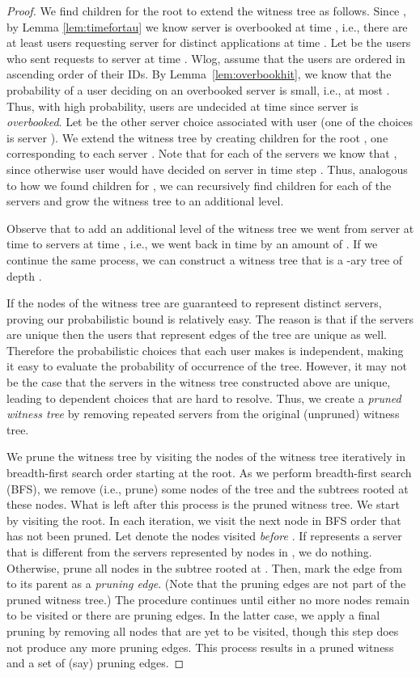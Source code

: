 \documentclass[conference]{IEEEtran}
\begin{document}
\begin{proof}
We find children for the root  to extend the witness tree as follows. Since , by Lemma \ref{lem:timefortau} we know server  is overbooked at time , i.e., there are at least   users requesting server  for  distinct applications at time . Let  be the users who sent requests to server  at time . Wlog, assume that the users  are ordered in ascending order of their IDs.  By Lemma~\ref{lem:overbookhit}, we know that the probability of a user deciding on an overbooked server is small, i.e., at most . Thus, with high probability, users   are undecided at time  since server  is \textsl{overbooked}. Let  be the other server choice associated with user  (one of the choices is server ).  We extend the witness tree by creating  children for the root , one corresponding to each server .  Note that for each of the servers  we know that , since otherwise user  would have decided on server  in time step . Thus, analogous to how we found children for , we can recursively find  children for each of the servers  and grow the witness tree to an additional level.   

Observe that to add an additional level of the witness tree we went from server  at time  to servers  at time , i.e., we went back in time by an amount of . If we continue the same process, we can construct a witness tree that is a -ary tree of depth . 


If the nodes of the witness tree are guaranteed to represent distinct servers, proving our probabilistic bound is relatively easy. The reason is that if the servers are unique then the users that represent edges of the tree are unique as well. Therefore the probabilistic choices that each user makes is independent, making it easy to evaluate the probability of occurrence of the tree. However, it may not be the case that the servers in the witness tree constructed above are unique, leading to dependent choices that are hard to resolve. Thus, we create a {\em pruned witness tree} by removing repeated servers from the  original (unpruned) witness tree. 

We prune the witness tree by visiting the nodes of the witness tree iteratively in breadth-first  search order starting at the root. As we perform breadth-first search (BFS), we remove (i.e., prune) some nodes of the tree and the subtrees rooted  at these nodes. What is left after this process is the pruned witness tree. We start by visiting the root. In each iteration, we visit the next  node  in BFS order that has not been pruned. Let  denote the nodes visited {\it before\/} . If  represents a server that is different from the servers represented by nodes in , we do nothing.
 Otherwise, prune all nodes in the subtree rooted at . Then, mark the edge from  to its parent  as a {\em pruning edge}. (Note that the pruning edges are not part of the pruned witness tree.) The procedure continues until either no more nodes remain to be visited or there are  pruning edges. In the latter case, we apply a final pruning by removing all nodes that are yet to be visited, though this step does not produce any more pruning edges. This process results in a pruned witness and a set of  (say) pruning edges.  


\end{proof}
\end{document}
